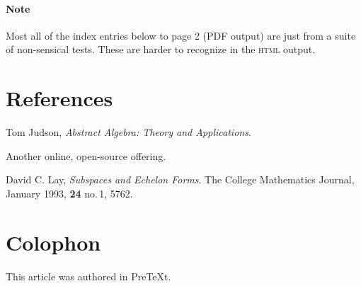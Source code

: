 \documentclass[10pt,]{article}
\newcommand{\initialism}[1]{\textsc{\MakeLowercase{#1}}}
\theoremstyle{plain}
\theoremstyle{definition}
\theoremstyle{definition}
\theoremstyle{definition}
\theoremstyle{definition}
\theoremstyle{definition}
\theoremstyle{definition}
\numberwithin{equation}{section}
\begin{document}
\paragraph[{Note}]{Note}\hypertarget{paragraphs-25}{}
\hypertarget{p-800}{}%
Most all of the index entries below to page 2 (PDF output) are just from a suite of non-sensical tests.  These are harder to recognize in the \initialism{HTML} output.%
\typeout{************************************************}
\typeout{************************************************}
\section*{References}\label{references-3}
\begin{referencelist}
\hypertarget{biblio-judson-AATA}{}Tom Judson, \textit{Abstract Algebra: Theory and Applications}. \par\hypertarget{note-judson-AATA}{}
\hypertarget{p-801}{}%
Another online, open-source offering.%

\hypertarget{biblio-lay-article}{}David C. Lay, \textit{Subspaces and Echelon Forms}. The College Mathematics Journal, January 1993, \textbf{24} no.\@\,1, 57\textendash{}62.
\end{referencelist}
%
\printindex
%
\section*{Colophon}
\hypertarget{colophon-1}{}\hypertarget{p-802}{}%
This article was authored in PreTeXt.%
\end{document}
